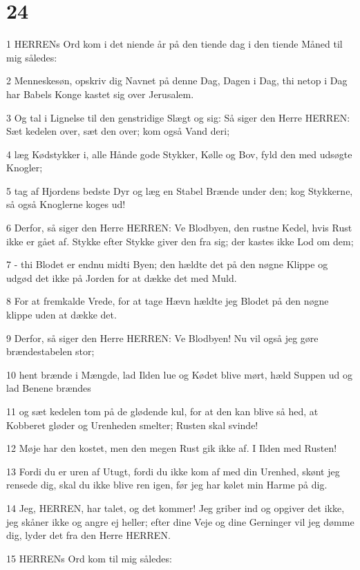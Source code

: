\chapter{24}

\par 1 HERRENs Ord kom i det niende år på den tiende dag i den tiende Måned til mig således:
\par 2 Menneskesøn, opskriv dig Navnet på denne Dag, Dagen i Dag, thi netop i Dag har Babels Konge kastet sig over Jerusalem.
\par 3 Og tal i Lignelse til den genstridige Slægt og sig: Så siger den Herre HERREN: Sæt kedelen over, sæt den over; kom også Vand deri;
\par 4 læg Kødstykker i, alle Hånde gode Stykker, Kølle og Bov, fyld den med udsøgte Knogler;
\par 5 tag af Hjordens bedste Dyr og læg en Stabel Brænde under den; kog Stykkerne, så også Knoglerne koges ud!
\par 6 Derfor, så siger den Herre HERREN: Ve Blodbyen, den rustne Kedel, hvis Rust ikke er gået af. Stykke efter Stykke giver den fra sig; der kastes ikke Lod om dem;
\par 7 - thi Blodet er endnu midti Byen; den hældte det på den nøgne Klippe og udgød det ikke på Jorden for at dække det med Muld.
\par 8 For at fremkalde Vrede, for at tage Hævn hældte jeg Blodet på den nøgne klippe uden at dække det.
\par 9 Derfor, så siger den Herre HERREN: Ve Blodbyen! Nu vil også jeg gøre brændestabelen stor;
\par 10 hent brænde i Mængde, lad Ilden lue og Kødet blive mørt, hæld Suppen ud og lad Benene brændes
\par 11 og sæt kedelen tom på de glødende kul, for at den kan blive så hed, at Kobberet gløder og Urenheden smelter; Rusten skal svinde!
\par 12 Møje har den kostet, men den megen Rust gik ikke af. I Ilden med Rusten!
\par 13 Fordi du er uren af Utugt, fordi du ikke kom af med din Urenhed, skønt jeg rensede dig, skal du ikke blive ren igen, før jeg har kølet min Harme på dig.
\par 14 Jeg, HERREN, har talet, og det kommer! Jeg griber ind og opgiver det ikke, jeg skåner ikke og angre ej heller; efter dine Veje og dine Gerninger vil jeg dømme dig, lyder det fra den Herre HERREN.
\par 15 HERRENs Ord kom til mig således:
